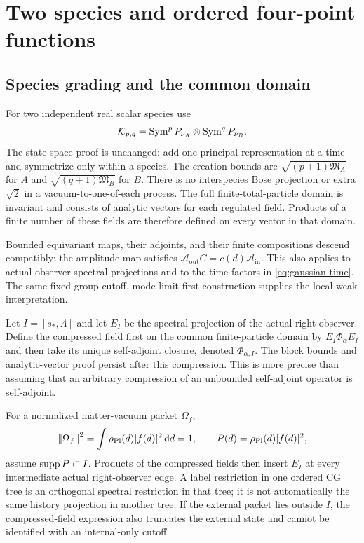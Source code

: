 \section{Two species and ordered four-point functions}
\label{sec:fourpoint}
\subsection{Species grading and the common domain}
For two independent real scalar species use
\begin{equation}
 \mathcal K_{p,q}=\operatorname{Sym}^pP_{\nu_A}\otimes\operatorname{Sym}^qP_{\nu_B}.
\end{equation}
The state-space proof is unchanged: add one principal representation at a
time and symmetrize only within a species. The creation bounds are
$\sqrt{(p+1)\mathfrak M_A}$ for $A$ and
$\sqrt{(q+1)\mathfrak M_B}$ for $B$. There is no interspecies Bose
projection or extra $\sqrt2$ in a vacuum-to-one-of-each process.
The full finite-total-particle domain is invariant and consists of analytic
vectors for each regulated field. Products of a finite number of these
fields are therefore defined on every vector in that domain.

Bounded equivariant maps, their adjoints, and their finite compositions
descend compatibly: the amplitude map satisfies
$\mathcal A_{\mathrm{out}}C=c(d)\mathcal A_{\mathrm{in}}$.
This also applies to actual observer spectral projections and to the
time factors in \eqref{eq:gaussian-time}. The same fixed-group-cutoff,
mode-limit-first construction supplies the local weak interpretation.

Let $I=[s_*,\Lambda]$ and let $E_I$ be the spectral projection of the
actual right observer. Define the compressed field first on the common
finite-particle domain by $E_I\Phi_\alpha E_I$ and then take its unique
self-adjoint closure, denoted $\Phi_{\alpha,I}$. The block bounds and
analytic-vector proof persist after this compression. This is more precise
than assuming that an arbitrary compression of an unbounded self-adjoint
operator is self-adjoint.

For a normalized matter-vacuum packet $\Omega_f$,
\begin{equation}
 \left\lVert\Omega_f\right\rVert^2=\int\rho_{\mathrm{Pl}}(d)|f(d)|^2\mathop{}\!\mathrm d d=1,\qquad
 P(d)=\rho_{\mathrm{Pl}}(d)|f(d)|^2,
\end{equation}
assume $\operatorname{supp} P\subset I$. Products of the compressed fields then insert
$E_I$ at every intermediate actual right-observer edge. A label restriction
in one ordered CG tree is an orthogonal spectral restriction in that tree;
it is not automatically the same history projection in another tree.
If the external packet lies outside $I$, the compressed-field expression
also truncates the external state and cannot be identified with an
internal-only cutoff.


